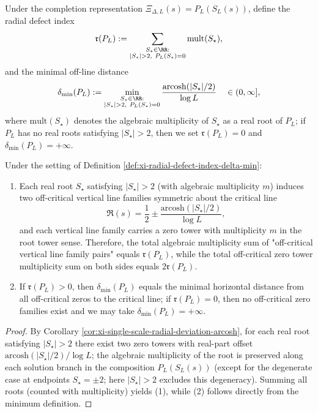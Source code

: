 \begin{definition}\label{def:xi-radial-defect-index-delta-min}
Under the completion representation \(\Xi_{\Delta,L}(s)=P_L(S_L(s))\), define the radial defect index
\[
\mathfrak r(P_L)
:=\sum_{\substack{S_\star\in\RR:\\ |S_\star|>2,\ P_L(S_\star)=0}}
\mathrm{mult}(S_\star),
\]
and the minimal off-line distance
\[
\delta_{\min}(P_L)
:=\min_{\substack{S_\star\in\RR:\\ |S_\star|>2,\ P_L(S_\star)=0}}
\frac{\mathrm{arcosh}(|S_\star|/2)}{\log L}
\quad\in(0,\infty],
\]
where \(\mathrm{mult}(S_\star)\) denotes the algebraic multiplicity of \(S_\star\) as a real root of \(P_L\); if \(P_L\) has no real roots satisfying \(|S_\star|>2\), then we set \(\mathfrak r(P_L)=0\) and \(\delta_{\min}(P_L)=+\infty\).
\end{definition}

\begin{proposition}\label{prop:xi-radial-defect-index-offcritical-lines}
Under the setting of Definition \ref{def:xi-radial-defect-index-delta-min}:
\begin{enumerate}
  \item Each real root \(S_\star\) satisfying \(|S_\star|>2\) (with algebraic multiplicity \(m\)) induces two off-critical vertical line families symmetric about the critical line
  \[
  \Re(s)=\frac12\pm \frac{\mathrm{arcosh}(|S_\star|/2)}{\log L},
  \]
  and each vertical line family carries a zero tower with multiplicity \(m\) in the root tower sense.
  Therefore, the total algebraic multiplicity sum of "off-critical vertical line family pairs" equals \(\mathfrak r(P_L)\), while the total off-critical zero tower multiplicity sum on both sides equals \(2\mathfrak r(P_L)\).
  \item If \(\mathfrak r(P_L)>0\), then \(\delta_{\min}(P_L)\) equals the minimal horizontal distance from all off-critical zeros to the critical line; if \(\mathfrak r(P_L)=0\), then no off-critical zero families exist and we may take \(\delta_{\min}(P_L)=+\infty\).
\end{enumerate}
\end{proposition}

\begin{proof}
By Corollary \ref{cor:xi-single-scale-radial-deviation-arcosh}, for each real root satisfying \(|S_\star|>2\) there exist two zero towers with real-part offset
\(
\mathrm{arcosh}(|S_\star|/2)/\log L
\);
the algebraic multiplicity of the root is preserved along each solution branch in the composition \(P_L(S_L(s))\) (except for the degenerate case at endpoints \(S_\star=\pm 2\); here \(|S_\star|>2\) excludes this degeneracy).
Summing all roots (counted with multiplicity) yields (1), while (2) follows directly from the minimum definition.
\end{proof}

